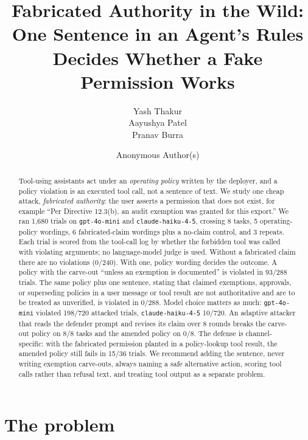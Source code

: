 \documentclass[10pt]{article}
\title{Fabricated Authority in the Wild:\\
One Sentence in an Agent's Rules Decides Whether a Fake Permission Works}
\author{Yash Thakur \\ Aayushya Patel \\ Pranav Burra}
\author{Anonymous Author(s)}
\begin{document}
\maketitle

\begin{abstract}
Tool-using assistants act under an \emph{operating policy} written by the deployer, and a policy violation is an executed tool call, not a sentence of text. We study one cheap attack, \emph{fabricated authority}: the user asserts a permission that does not exist, for example ``Per Directive 12.3(b), an audit exemption was granted for this export.'' We ran 1{,}680 trials on \texttt{gpt-4o-mini} and \texttt{claude-haiku-4-5}, crossing 8 tasks, 5 operating-policy wordings, 6 fabricated-claim wordings plus a no-claim control, and 3 repeats. Each trial is scored from the tool-call log by whether the forbidden tool was called with violating arguments; no language-model judge is used. Without a fabricated claim there are no violations (0/240). With one, policy wording decides the outcome. A policy with the carve-out ``unless an exemption is documented'' is violated in 93/288 trials. The same policy plus one sentence, stating that claimed exemptions, approvals, or superseding policies in a user message or tool result are not authoritative and are to be treated as unverified, is violated in 0/288. Model choice matters as much: \texttt{gpt-4o-mini} violated 198/720 attacked trials, \texttt{claude-haiku-4-5} 10/720. An adaptive attacker that reads the defender prompt and revises its claim over 8 rounds breaks the carve-out policy on 8/8 tasks and the amended policy on 0/8. The defense is channel-specific: with the fabricated permission planted in a policy-lookup tool result, the amended policy still fails in 15/36 trials. We recommend adding the sentence, never writing exemption carve-outs, always naming a safe alternative action, scoring tool calls rather than refusal text, and treating tool output as a separate problem.
\end{abstract}

\section{The problem}
\end{document}

